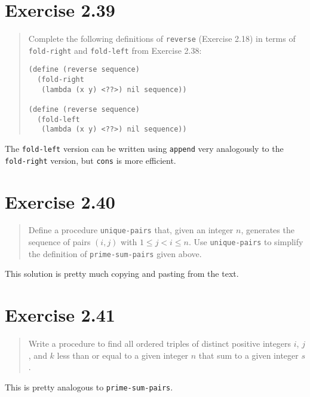 \documentclass{article}
\begin{document}
\section{Exercise 2.39}
\begin{quote}
    Complete the following definitions of \texttt{reverse} (Exercise 2.18) in
    terms of \texttt{fold-right} and \texttt{fold-left} from Exercise 2.38:
    \begin{lstlisting}
(define (reverse sequence)
  (fold-right
   (lambda (x y) <??>) nil sequence))

(define (reverse sequence)
  (fold-left
   (lambda (x y) <??>) nil sequence))
    \end{lstlisting}
\end{quote}


The \texttt{fold-left} version can be written using \texttt{append} very
analogously to the \texttt{fold-right} version, but \texttt{cons} is more
efficient.


\section{Exercise 2.40}
\begin{quote}
    Define a procedure \texttt{unique-pairs} that, given an integer $n$,
    generates the sequence of pairs $(i,j)$ with $1 \leq j < i \leq n$. Use
    \texttt{unique-pairs} to simplify the definition of
    \texttt{prime-sum-pairs} given above.
\end{quote}

This solution is pretty much copying and pasting from the text.



\section{Exercise 2.41}
\begin{quote}
    Write a procedure to find all ordered triples of distinct positive integers
    $i$, $j$, and $k$ less than or equal to a given integer $n$ that sum to a given
    integer $s$.
\end{quote}

This is pretty analogous to \texttt{prime-sum-pairs}.

\end{document}
